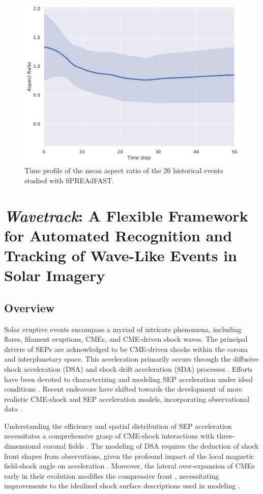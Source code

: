 \begin{figure}[!htp] %
	\centerline{\includegraphics[width=0.8\columnwidth]{chapter2/figs/mean_aspectratio_stat.pdf}}
	\caption{Time profile of the mean aspect ratio of the 26 historical events studied with SPREAdFAST.}
	\label{fig_mean_aspectratio_all}
\end{figure}


\section{\textit{Wavetrack}: A Flexible Framework for Automated Recognition and Tracking of Wave-Like Events in Solar Imagery}
\subsection{Overview}
Solar eruptive events encompass a myriad of intricate phenomena, including flares, filament eruptions, CMEs, and CME-driven shock waves. The principal drivers of SEPs are acknowledged to be CME-driven shocks within the corona and interplanetary space. This acceleration primarily occurs through the diffusive shock acceleration (DSA) and shock drift acceleration (SDA) processes \citep{reames_2021}. Efforts have been devoted to characterizing and modeling SEP acceleration under ideal conditions \citep{vainio_2008, sokolov_2009, kozarev_2013}. Recent endeavors have shifted towards the development of more realistic CME-shock and SEP acceleration models, incorporating observational data \citep{vourlidas_2012, kwon_2014, kozarev_2015, kozarev_2019}.

Understanding the efficiency and spatial distribution of SEP acceleration necessitates a comprehensive grasp of CME-shock interactions with three-dimensional coronal fields \cite{rouillard_2016}. The modeling of DSA requires the deduction of shock front shapes from observations, given the profound impact of the local magnetic field-shock angle on acceleration \cite{guo_2013}. Moreover, the lateral over-expansion of CMEs early in their evolution modifies the compressive front \cite{bein_2011, temmer_2016}, necessitating improvements to the idealized shock surface descriptions used in modeling \citep{vourlidas_2012, kwon_2014, rouillard_2016}.

